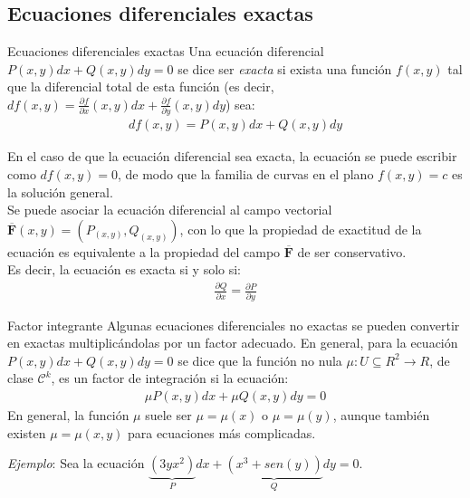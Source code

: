 \documentclass[a4paper, twoside]{article}
\numberwithin{equation}{section}
\numberwithin{figure}{section}
\numberwithin{table}{section}
\newcommand{\vect}[1]{\overline{\textbf{#1}}}
\begin{document}
\subsection{Ecuaciones diferenciales exactas}
\begin{definicion*}{Ecuaciones diferenciales exactas}
	Una ecuación diferencial $P(x,y)dx+Q(x,y)dy=0$ se dice ser \emph{exacta} si exista una función $f(x,y)$ tal que la diferencial total de esta función (es decir, $df(x,y)=\frac{\partial f}{\partial x}(x,y)dx+\frac{\partial f}{\partial y}(x,y)dy$) sea:
	\begin{align}
		df(x,y)=P(x,y)dx+Q(x,y)dy
	\end{align}
	
	En el caso de que la ecuación diferencial sea exacta, la ecuación se puede escribir como $df(x,y)=0$, de modo que la familia de curvas en el plano $f(x,y)=c$ es la solución general.\\
	
	Se puede asociar la ecuación diferencial al campo vectorial $\vect{F}(x,y)=(P_{(x,y)},Q_{(x,y)})$, con lo que la propiedad de exactitud de la ecuación es equivalente a la propiedad del campo $\vect{F}$ de ser conservativo.\\

	Es decir, la ecuación es exacta si y solo si:
	\begin{align}
		\frac{\partial Q}{\partial x}=\frac{\partial P}{\partial y}
	\end{align}
\end{definicion*}

\begin{definicion*}{Factor integrante}
	Algunas ecuaciones diferenciales no exactas se pueden convertir en exactas multiplicándolas por un factor adecuado. En general, para la ecuación $P(x,y)dx+Q(x,y)dy=0$ se dice que la función no nula $\mu:U\subseteq R^2 \to R$, de clase $\mathcal{C}^{k}$, es un factor de integración si la ecuación:
	\begin{align}
		\mu P(x,y)dx+\mu Q(x,y)dy=0
	\end{align}
	En general, la función $\mu$ suele ser $\mu=\mu(x)$ o $\mu=\mu(y)$, aunque también existen $\mu=\mu(x,y)$ para ecuaciones más complicadas.
\end{definicion*}

\vspace{1cm}

\emph{Ejemplo}: Sea la ecuación $\underbrace{(3yx^2)}_{P}dx+\underbrace{(x^3+sen(y))}_{Q}dy=0$.\\
\end{document}
